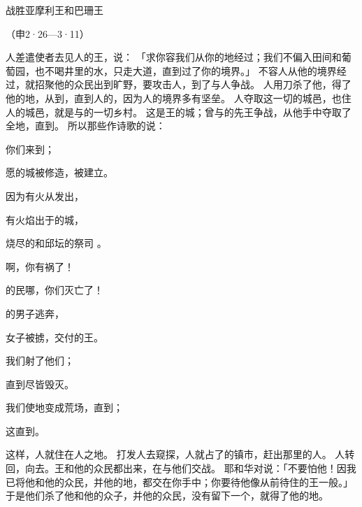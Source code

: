 {\par }{\SH 战胜亚摩利王和巴珊王
\par }{\R （申2·26—3·11）
\par }{\PP {}人差遣使者去见{}人的王{}，说：
「求你容我们从你的地经过；我们不偏入田间和葡萄园，也不喝井里的水，只走大道，直到过了你的境界。」
不容{}人从他的境界经过，就招聚他的众民出到旷野，要攻击{}人，到了{}与{}人争战。
人用刀杀了他，得了他的地，从{}到{}，直到{}人的{}，因为{}人的境界多有坚垒。
人夺取这一切的城邑，也住{}人的城邑，就是{}与{}的一切乡村。
这{}是{}王{}的{}城；{}曾与{}的先王争战，从他手中夺取了全地，直到{}。
所以那些作诗歌的说：
\par }{\Q 你们来到{}；
\par }{\Q 愿{}的城被修造，被建立。
\par }{\Q {}因为有火从{}发出，
\par }{\Q 有火焰出于{}的城，
\par }{\Q 烧尽{}的{}和{}邱坛的祭司
。
\par }{\Q {}啊，你有祸了！
\par }{的民哪，你们灭亡了！
\par }{的男子逃奔，
\par }{\Q 女子被掳，交付{}的王{}。
\par }{\Q {}我们射了他们；
\par }{直到{}尽皆毁灭。
\par }{\Q 我们使地变成荒场，直到{}；
\par }{\Q 这{}直{}到{}。
\par }{\PP {}这样，{}人就住在{}人之地。
打发人去窥探{}，{}人就占了{}的镇市，赶出那里的{}人。
人转回，向{}去。{}王{}和他的众民都出来，在{}与他们交战。
耶和华对{}说：「不要怕他！因我已将他和他的众民，并他的地，都交在你手中；你要待他像从前待住{}的{}王{}一般。」
于是他们杀了他和他的众子，并他的众民，没有留下一个，就得了他的地。

}
